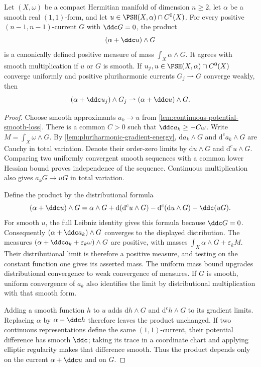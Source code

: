 \begin{theorem}\label{thm:continuous-pluriharmonic-trace-product}
Let $(X,\omega)$ be a compact Hermitian manifold of dimension $n\geq2$, let $\alpha$ be a smooth real $(1,1)$-form, and let $u\in\PSH(X,\alpha)\cap C^0(X)$. For every positive $(n-1,n-1)$-current $G$ with $\ddc G=0$, the product
\[
 (\alpha+\ddc u)\wedge G
\]
is a canonically defined positive measure of mass $\int_X\alpha\wedge G$. It agrees with smooth multiplication if $u$ or $G$ is smooth. If $u_j,u\in\PSH(X,\alpha)\cap C^0(X)$ converge uniformly and positive pluriharmonic currents $G_j\rightharpoonup G$ converge weakly, then
\[
 (\alpha+\ddc u_j)\wedge G_j
 \rightharpoonup(\alpha+\ddc u)\wedge G.
\]
\end{theorem}
\begin{proof}
Choose smooth approximants $a_k\to u$ from \cref{lem:continuous-potential-smooth-loss}. There is a common $C>0$ such that $\ddc a_k\geq-C\omega$. Write $M=\int_X\omega\wedge G$. By \cref{lem:pluriharmonic-gradient-energy}, $\mathrm{d}a_k\wedge G$ and $\mathrm{d}^ca_k\wedge G$ are Cauchy in total variation. Denote their order-zero limits by $\mathrm{d}u\wedge G$ and $\mathrm{d}^cu\wedge G$. Comparing two uniformly convergent smooth sequences with a common lower Hessian bound proves independence of the sequence. Continuous multiplication also gives $a_kG\to uG$ in total variation.

Define the product by the distributional formula
\begin{equation}\label{eq:continuous-pluriharmonic-product}
 (\alpha+\ddc u)\wedge G
 =\alpha\wedge G+\mathrm{d}(\mathrm{d}^cu\wedge G)
   -\mathrm{d}^c(\mathrm{d}u\wedge G)-\ddc(uG).
\end{equation}
For smooth $u$, the full Leibniz identity gives this formula because $\ddc G=0$. Consequently $(\alpha+\ddc a_k)\wedge G$ converges to the displayed distribution. The measures $(\alpha+\ddc a_k+\varepsilon_k\omega)\wedge G$ are positive, with masses $\int_X\alpha\wedge G+\varepsilon_kM$. Their distributional limit is therefore a positive measure, and testing on the constant function one gives its asserted mass. The uniform mass bound upgrades distributional convergence to weak convergence of measures. If $G$ is smooth, uniform convergence of $a_k$ also identifies the limit by distributional multiplication with that smooth form.

Adding a smooth function $h$ to $u$ adds $\mathrm{d}h\wedge G$ and $\mathrm{d}^ch\wedge G$ to its gradient limits. Replacing $\alpha$ by $\alpha-\ddc h$ therefore leaves the product unchanged. If two continuous representations define the same $(1,1)$-current, their potential difference has smooth $\ddc$; taking its trace in a coordinate chart and applying elliptic regularity makes that difference smooth. Thus the product depends only on the current $\alpha+\ddc u$ and on $G$.


\end{proof}
